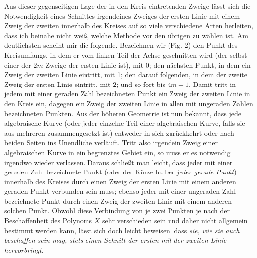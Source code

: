  Aus dieser gegenseitigen Lage der in den Kreis eintretenden Zweige lässt sich die Notwendigkeit eines Schnittes irgendeines Zweiges der ersten Linie mit einem Zweig der zweiten innerhalb des Kreises auf so viele verschiedene Arten herleiten, dass ich beinahe nicht weiß, welche Methode vor den übrigen zu wählen ist. Am deutlichsten scheint mir die folgende. Bezeichnen wir (Fig. 2) den Punkt des Kreisumfangs, in dem er vom linken Teil der Achse geschnitten wird (der selbst einer der $2m$ Zweige der ersten Linie ist), mit 0; den nächsten Punkt, in dem ein Zweig der zweiten Linie eintritt, mit 1; den darauf folgenden, in dem der zweite Zweig der ersten Linie eintritt, mit 2; und so fort bis $4m-1$. Damit tritt in jedem mit einer geraden Zahl bezeichneten Punkt ein Zweig der zweiten Linie in den Kreis ein, dagegen ein Zweig der zweiten Linie in allen mit ungeraden Zahlen bezeichneten Punkten. Aus der höheren Geometrie ist nun bekannt, dass jede algebraische Kurve (oder jeder einzelne Teil einer algebraischen Kurve, falls sie aus mehreren zusammengesetzt ist) entweder in sich zurückkehrt oder nach beiden Seiten ins Unendliche verläuft. Tritt also irgendein Zweig einer algebraischen Kurve in ein begrenztes Gebiet ein, so muss er es notwendig irgendwo wieder verlassen. Daraus schließt man leicht, dass jeder mit einer geraden Zahl
 bezeichnete Punkt (oder der Kürze halber \textit{jeder gerade Punkt}) innerhalb des Kreises durch einen Zweig der ersten Linie mit einem anderen geraden Punkt verbunden sein muss; ebenso jeder mit einer ungeraden Zahl bezeichnete Punkt durch einen Zweig der zweiten Linie mit einem anderen solchen Punkt. Obwohl diese Verbindung von je zwei Punkten je nach der Beschaffenheit des Polynoms $X$ sehr verschieden sein und daher nicht allgemein bestimmt werden kann, lässt sich doch leicht beweisen, dass \textit{sie, wie sie auch beschaffen sein mag, stets einen Schnitt der ersten mit der zweiten Linie hervorbringt.}

